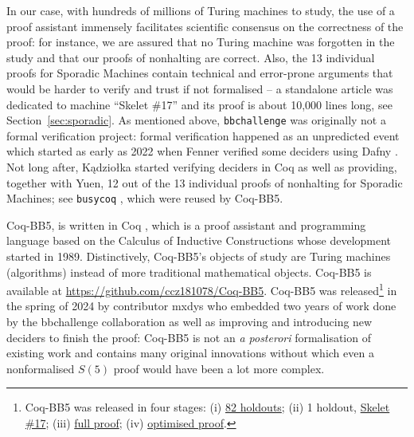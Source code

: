 \documentclass[a4paper,british]{article}
\theoremstyle{definition} %
\numberwithin{equation}{section}
\theoremstyle{definition} %
\newcommand{\CoqBB}{Coq-BB5\xspace}
\begin{document}

In our case, with hundreds of millions of Turing machines to study, the use of a proof assistant immensely facilitates scientific consensus on the correctness of the proof: for instance, we are assured that no Turing machine was forgotten in the study and that our proofs of nonhalting are correct. Also, the 13 individual proofs for Sporadic Machines contain technical and error-prone arguments that would be harder to verify and trust if not formalised -- \eg a standalone article was dedicated to machine ``Skelet \#17'' \cite{xu2024skelet17fifthbusy} and its \Coq proof is about 10,000 lines long, see Section~\ref{sec:sporadic}. As mentioned above, \texttt{bbchallenge} was originally not a formal verification project: formal verification happened as an unpredicted event which started as early as 2022 when Fenner verified some deciders using Dafny \cite{dafny_fenner, Dafny}. Not long after, Kądziołka started verifying deciders in Coq as well as providing, together with Yuen, 12 out of the 13 individual proofs of nonhalting for Sporadic Machines; see  \texttt{busycoq} \cite{busycoq}, which were reused by \CoqBB.

\CoqBB, is written in Coq \cite{the_coq_development_team_2024_14542673}, which is a proof assistant and programming language based on the Calculus of Inductive Constructions \cite{CoC} whose development started in 1989. Distinctively, \CoqBB's objects of study are Turing machines (\ie algorithms) instead of more traditional mathematical objects. \CoqBB is available at \url{https://github.com/ccz181078/Coq-BB5}. \CoqBB was released\footnote{\CoqBB was released in four stages: (i) \href{https://discuss.bbchallenge.org/t/proving-bb-5-in-coq/225}{82 holdouts}; (ii) 1 holdout, \href{https://bbchallenge.org/1RB---_0LC1RE_0LD1LC_1RA1LB_0RB0RA}{Skelet \#17}; (iii) \href{https://discuss.bbchallenge.org/t/july-2nd-2024-we-have-proved-bb-5-47-176-870/237}{full proof}; (iv) \href{https://github.com/ccz181078/Coq-BB5}{optimised proof}.} in the spring of 2024 by contributor mxdys who embedded two years of work done by the bbchallenge collaboration as well as improving and introducing new deciders to finish the proof: \CoqBB is not an \textit{a posterori} formalisation of existing work and contains many original innovations without which even a nonformalised $S(5)$ proof would have been a lot more complex.
\end{document}
